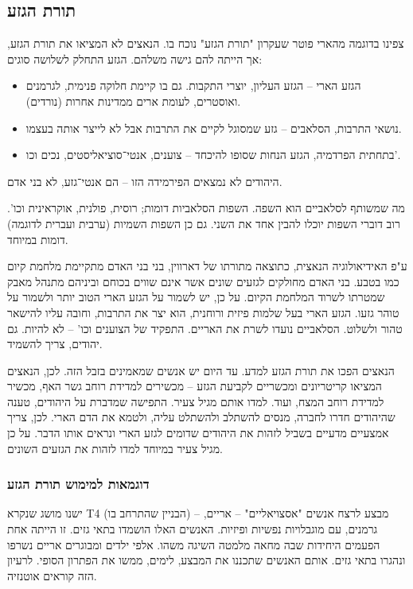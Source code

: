 \documentclass[a4paper]{book}
\begin{document}
	\subsection{תורת הגזע}
	צפינו בדוגמה מהארי פוטר שעקרון "תורת הגזע" נוכח בו. הנאצים לא המציאו את תורת הגזע, אך הייתה להם גישה משלהם. הגזע התחלק לשלושה סוגים: 
	\begin{itemize}
		\item הגזע הארי – הגזע העליון, יוצרי התקבות. גם בו קיימת חלוקה פנימית, לגרמנים ואוסטרים, לעומת ארים ממדינות אחרות (נורדים). 
		\item נושאי התרבות, הסלאבים – גזע שמסוגל לקיים את התרבות אבל לא לייצר אותה בעצמו. 
		\item בתחתית הפרדמיה, הגזע הנחות שסופו להיכחד – צוענים, אנטי־סוציאליסטים, נכים וכו'. 
	\end{itemize}
	היהודים לא נמצאים הפירמידה הזו – הם אנטי־גזע, לא בני אדם. 
	
	מה שמשותף לסלאביים הוא השפה. השפות הסלאביות דומות; רוסית, פולנית, אוקראינית וכו'. רוב דוברי השפות יוכלו להבין אחד את השני. גם כן השפות השמיות (ערבית ועברית לדוגמה) דומות במיוחד. 
	
	ע"פ האידיאולוגיה הנאצית, כתוצאה מתורתו של דארווין, בני בני האדם מתקיימת מלחמת קיום כמו בטבע. בני האדם מחולקים לגזעים שונים אשר אינם שווים בכוחם וביניהם מתנהל מאבק שמטרתו לשרוד המלחמת הקיום. על כן, יש לשמור על הגזע הארי הטוב יותר ולשמור על טוהר גזעו. הגזע הארי בעל שלמות פיזית ורוחנית, הוא יצר את התרבות, וחובה עליו להישאר טהור ולשלוט. הסלאביים נועדו לשרת את האריים. התפקיד של הצוענים וכו' – לא להיות. גם יהודים, צריך להשמיד. 
	
	הנאצים הפכו את תורת הגזע למדע. עד היום יש אנשים שמאמינים בזבל הזה. לכן, הנאצים המציאו קריטריונים ומכשריים לקביעת הגזע – מכשירים למדידת רוחב גשר האף, מכשיר למדידת רוחב המצח, ועוד. למדו אותם מגיל צעיר. התפישה שמדברת על היהודים, טענה שהיהודים חדרו לחברה, מנסים להשתלב ולהשתלט עליה, ולטמא את הדם הארי. לכן, צריך אמצעיים מדעיים בשביל לזהות את היהודים שדומים לגזע הארי ונראים אותו הדבר. על כן מגיל צעיר במיוחד למדו לזהות את הגזעים השונים. 
	
		
	\subsubsection{דוגמאות למימוש תורת הגזע}
	
	ישנו מושג שנקרא T4 (הבניין שהתרחב בו) – מבצע לרצח אנשים "אסצויאליים" – אריים, גרמנים, עם מוגבלויות נפשיות ופיזיות. האנשים האלו הושמדו בתאי גזים. זו הייתה אחת הפעמים היחידות שבה מחאה מלמטה השיגה משהו. אלפי ילדים ומבוגרים אריים נשרפו ונהגרו בתאי גזים. אותם האנשים שתכננו את המבצע, לימים, ממשו את הפתרון הסופי. לרעיון הזה קוראים אוטנזיה. 
	
\end{document}
